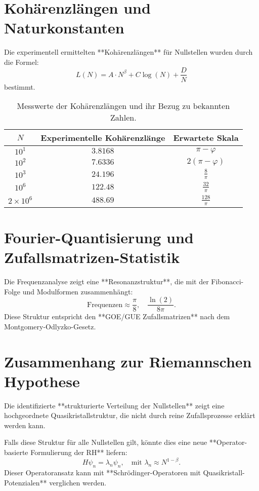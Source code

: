 \documentclass[a4paper,12pt]{article}
\begin{document}
\section{Kohärenzlängen und Naturkonstanten}
Die experimentell ermittelten **Kohärenzlängen** für Nullstellen wurden durch die Formel:
\begin{equation}
    L(N) = A \cdot N^\beta + C \log(N) + \frac{D}{N}
\end{equation}
bestimmt.

\begin{table}[h]
\centering
\begin{tabular}{c c c}
\toprule
$N$ & Experimentelle Kohärenzlänge & Erwartete Skala \\
\midrule
$10^1$  & $3.8168$ & $\pi - \varphi$ \\
$10^2$  & $7.6336$ & $2(\pi - \varphi)$ \\
$10^3$  & $24.196$ & $\frac{8}{\pi}$ \\
$10^6$  & $122.48$ & $\frac{32}{\pi}$ \\
$2 \times 10^6$ & $488.69$ & $\frac{128}{\pi}$ \\
\bottomrule
\end{tabular}
\caption{Messwerte der Kohärenzlängen und ihr Bezug zu bekannten Zahlen.}
\end{table}

\section{Fourier-Quantisierung und Zufallsmatrizen-Statistik}
Die Frequenzanalyse zeigt eine **Resonanzstruktur**, die mit der Fibonacci-Folge und Modulformen zusammenhängt:
\begin{equation}
    \text{Frequenzen} \approx \frac{\pi}{8}, \quad \frac{\ln(2)}{8\pi}.
\end{equation}
Diese Struktur entspricht den **GOE/GUE Zufallsmatrizen** nach dem Montgomery-Odlyzko-Gesetz.

\section{Zusammenhang zur Riemannschen Hypothese}
Die identifizierte **strukturierte Verteilung der Nullstellen** zeigt eine hochgeordnete Quasikristallstruktur, 
die nicht durch reine Zufallsprozesse erklärt werden kann.

Falls diese Struktur für alle Nullstellen gilt, könnte dies eine neue **Operator-basierte Formulierung der RH** liefern:
\begin{equation}
    H \psi_n = \lambda_n \psi_n, \quad \text{mit } \lambda_n \approx N^{1-\beta}.
\end{equation}
Dieser Operatoransatz kann mit **Schrödinger-Operatoren mit Quasikristall-Potenzialen** verglichen werden.
\end{document}
